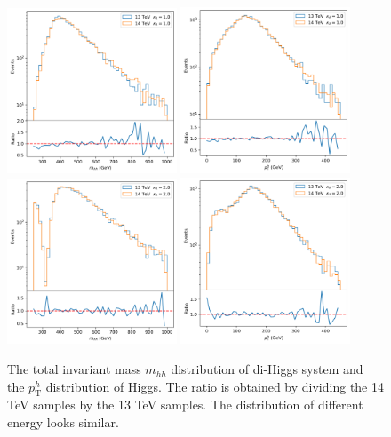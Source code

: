 \documentclass[12pt]{article}
\begin{document}
		\begin{figure}[htpb]
			\centering
			\includegraphics[width=0.45\textwidth]{di-Higgs-SM-kappa1-mhh-13-14TeV.png}
			\includegraphics[width=0.45\textwidth]{di-Higgs-SM-kappa1-pt-13-14TeV.png}
			\includegraphics[width=0.45\textwidth]{di-Higgs-SM-kappa2-mhh-13-14TeV.png}
			\includegraphics[width=0.45\textwidth]{di-Higgs-SM-kappa2-pt-13-14TeV.png}
			\caption{The total invariant mass $m_{hh}$ distribution of di-Higgs system and the $p_{\text{T}}^{h}$ distribution of Higgs. The ratio is obtained by dividing the 14 TeV samples by the 13 TeV samples. The distribution of different energy looks similar.}
			\label{fig:di-Higgs-SM-kappa-13-14TeV}
		\end{figure}
\end{document}
